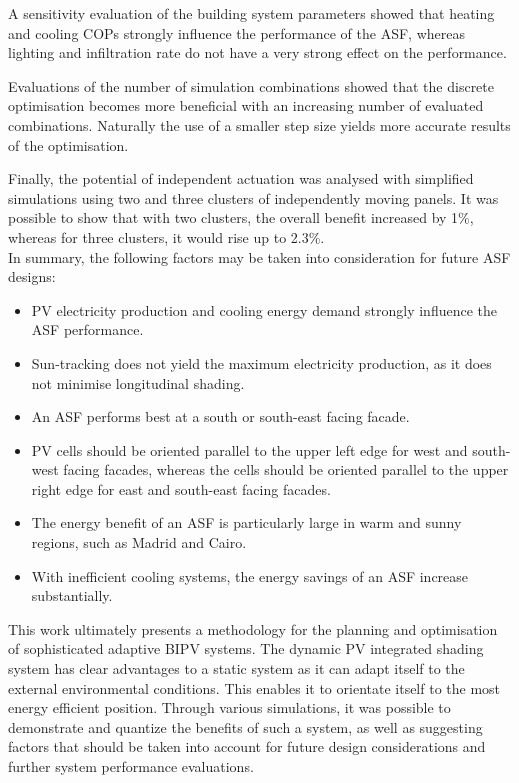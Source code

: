 A sensitivity evaluation of the building system parameters showed that heating and cooling COPs strongly influence the performance of the ASF, whereas lighting and infiltration rate do not have a very strong effect on the performance. 

Evaluations of the number of simulation combinations showed that the discrete optimisation becomes more beneficial with an increasing number of evaluated combinations. Naturally the use of a smaller step size yields more accurate results of the optimisation. 

Finally, the potential of independent actuation was analysed with simplified simulations using two and three clusters of independently moving panels. It was possible to show that with two clusters, the overall benefit increased by 1\%, whereas for three clusters, it would rise up to 2.3\%. \\

In summary, the following factors may be taken into consideration for future ASF designs:

\begin{itemize}

\item PV electricity production and cooling energy demand strongly influence the ASF performance.
\item Sun-tracking does not yield the maximum electricity production, as it does not minimise longitudinal shading.
\item An ASF performs best at a south or south-east facing facade.
\item PV cells should be oriented parallel to the upper left edge for west and south-west facing facades, whereas the cells should be oriented parallel to the upper right edge for east and south-east facing facades. 
\item The energy benefit of an ASF is particularly large in warm and sunny regions, such as Madrid and Cairo.
\item With inefficient cooling systems, the energy savings of an ASF increase substantially.

\end{itemize}

This work ultimately presents a methodology for the planning and optimisation of sophisticated adaptive BIPV systems. The dynamic PV integrated shading system has clear advantages to a static system as it can adapt itself to the external environmental conditions. This enables it to orientate itself to the most energy efficient position. Through various simulations, it was possible to demonstrate and quantize the benefits of such a system, as well as suggesting factors that should be taken into account for future design considerations and further system performance evaluations. 